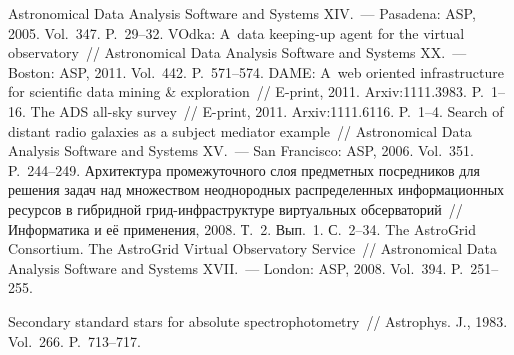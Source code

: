 \begin{multicols}{2}
{{\begin{thebibliography}{99}
Astronomical Data Analysis Software and Systems XIV.~--- Pasadena: ASP, 2005. Vol.~347. P.~29--32.
VOdka: A~data keeping-up agent for the virtual observatory~// 
Astronomical Data Analysis Software and Systems XX.~--- Boston: ASP, 2011. Vol.~442. P.~571--574.
 DAME: 
A~web oriented infrastructure for scientific data mining \& exploration~// E-print, 2011. 
Arxiv:1111.3983. P.~1--16.
 The ADS all-sky survey~// E-print, 2011. 
Arxiv:1111.6116. P.~1--4.
Search of distant radio 
galaxies as a subject mediator example~// Astronomical Data Analysis Software and Systems XV.~---
San Francisco: ASP, 2006. Vol.~351. P.~244--249. 
 Архитектура промежуточного слоя 
предметных посредников для \mbox{решения} задач над множеством неоднородных распределенных 
информационных ресурсов в гибридной грид-инфра\-струк\-ту\-ре виртуальных обсерваторий~//\linebreak 
Информатика и её применения, 2008. Т.~2. Вып.~1. С.~2--34.
The AstroGrid Consortium. The AstroGrid Virtual Observatory Service~// 
Astronomical Data Analysis Software and Systems XVII.~--- London: ASP, 2008. Vol.~394. P.~251--255.

\label{end\stat}

 Secondary standard stars for absolute spectrophotometry~// 
Astrophys. J., 1983. Vol.~266. P.~713--717.
\end{thebibliography}
}
}


\end{multicols}